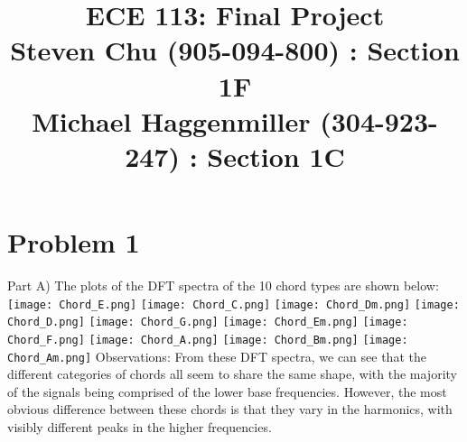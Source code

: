\documentclass[letterpaper,twocolumn,10pt]{article}
\begin{document}
\date{}
\onecolumn

\title{\Large \bf ECE 113: Final Project \\
Steven Chu (905-094-800) : Section 1F\\
Michael Haggenmiller (304-923-247) : Section 1C}

\maketitle

\section*{Problem 1}
Part A)
The plots of the DFT spectra of the 10 chord types are shown below: \hspace*{\fill}
\vspace{3mm}
\linebreak
\texttt{[image: Chord\_E.png]}
\texttt{[image: Chord\_C.png]}
\texttt{[image: Chord\_Dm.png]}
\texttt{[image: Chord\_D.png]}
\texttt{[image: Chord\_G.png]}
\texttt{[image: Chord\_Em.png]}
\texttt{[image: Chord\_F.png]}
\texttt{[image: Chord\_A.png]}
\texttt{[image: Chord\_Bm.png]}
\hspace{4mm}
\texttt{[image: Chord\_Am.png]}
\vspace{3mm}
\linebreak
Observations:
From these DFT spectra, we can see that the different categories of chords all seem to share the same shape, with the majority of the signals being comprised of the lower base frequencies. However, the most obvious difference between these chords is that they vary in the harmonics, with visibly different peaks in the higher frequencies. \hspace*{\fill}
\linebreak
\end{document}
